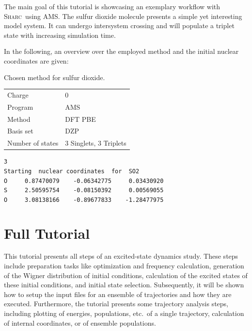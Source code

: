 \documentclass[a4paper,11pt,DIV=15,openany]{scrbook}
\newcommand{\sharc}{\textsc{Sharc}}
\newenvironment{example}{
  \vspace{0mm}
  \definecolor{shadecolor}{HTML}{E4F4FF}
  \begin{shaded}
}{
  \end{shaded}
}
\begin{document}
The main goal of this tutorial is showcasing an exemplary workflow with \sharc\ using AMS. 
The sulfur dioxide molecule presents a simple yet interesting model system. It can undergo intersystem crossing and will populate a triplet state with increasing simulation time.

In the following, an overview over the employed method and the initial nuclear coordinates are given:

\begin{example}
\begin{minipage}{0.4\textwidth}
  \centering
  Chosen method for sulfur dioxide.
  \begin{tabular}{ll}
    \toprule
    Charge              &0\\
    Program             &\textsc{AMS}\\
    Method              &DFT PBE\\
    Basis set           &DZP\\
    Number of states    &3 Singlets, 3 Triplets\\
    \bottomrule
  \end{tabular}
\end{minipage}
\hfill
\begin{minipage}{0.55\textwidth}
  \begin{verbatim}
3
Starting  nuclear coordinates  for  SO2
O     0.87470079    -0.06342775     0.03430920 
S     2.50595754    -0.08150392     0.00569055 
O     3.08138166    -0.89677833    -1.28477975 
\end{verbatim}
\end{minipage}
\end{example}









\chapter{Full Tutorial}\label{chap:full}

This tutorial presents all steps of an excited-state dynamics study. 
These steps include preparation tasks like optimization and frequency calculation, generation of the Wigner distribution of initial conditions, calculation of the excited states of these initial conditions, and initial state selection. 
Subsequently, it will be shown how to setup the input files for an ensemble of trajectories and how they are executed.
Furthermore, the tutorial presents some trajectory analysis steps, including plotting of energies, populations, etc.\ of a single trajectory, calculation of internal coordinates, or of ensemble populations.
\end{document}
